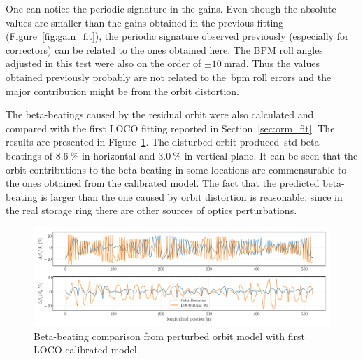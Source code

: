 One can notice the periodic signature in the gains. Even though the absolute values are smaller than the gains obtained in the previous fitting (Figure~\ref{fig:gain_fit}), the periodic signature observed previously (especially for correctors) can be related to the ones obtained here. The BPM roll angles adjusted in this test were also on the order of $\pm\SI{10}{\milli\radian}$. Thus the values obtained previously probably are not related to the~\gls{bpm} roll errors and the major contribution might be from the orbit distortion.

The beta-beatings caused by the residual orbit were also calculated and compared with the first LOCO fitting reported in Section~\ref{sec:orm_fit}. The results are presented in Figure~\ref{fig:beta_beating_orb}. The disturbed orbit produced~\gls{std} beta-beatings of $\SI{8.6}{\%}$ in horizontal and $\SI{3.0}{\%}$ in vertical plane. It can be seen that the orbit contributions to the beta-beating in some locations are commensurable to the ones obtained from the calibrated model. The fact that the predicted beta-beating is larger than the one caused by orbit distortion is reasonable, since in the real storage ring there are other sources of optics perturbations. 
\begin{figure}
\centering
\includegraphics[width=1.0\textwidth]{figures/beta_beating_orbit_loco_iter0.pdf}
\caption{Beta-beating comparison from perturbed orbit model with first LOCO calibrated model.}
\label{fig:beta_beating_orb}
\end{figure}

